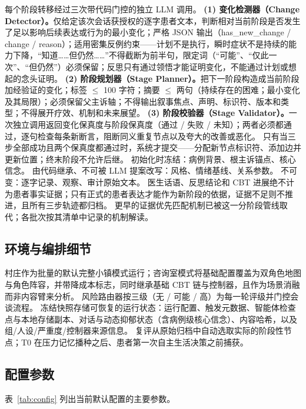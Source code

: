 \documentclass[11pt,a4paper]{article}
\begin{document}
每个阶段转移经过三次带代码门控的独立 LLM 调用。
\textbf{(1) 变化检测器（Change Detector）。}仅给定该次会话获授权的逐字患者文本，判断相对当前阶段是否发生了足以影响后续表达或行为的最小变化；严格 JSON 输出（has\_new\_change / change / reason）；适用密集反例约束——计划不是执行，瞬时症状不是持续的能力下降，“知道……但仍然……”不得截断为前半句，限定词（“可能”、“仅此一次”、“但仍然”）必须保留；反思只有通过领悟才能证明变化，不能通过计划或想起的念头证明。
\textbf{(2) 阶段规划器（Stage Planner）。}把下一阶段构造成当前阶段加经验证的变化；标签 $\le$ 100 字符；摘要 $\le$ 两句（持续存在的困难；最小变化及其局限）；必须保留父主诉轴；不得输出叙事焦点、声明、标识符、版本和类型；不得展开疗效、机制和未来展望。
\textbf{(3) 阶段校验器（Stage Validator）。}一次独立调用返回变化保真度与阶段保真度（通过 / 失败 / 未知）；两者必须都通过，逐句检查每条新断言，阻断同义重复节点以及夸大的改善或恶化。
只有当三步全部成功且两个保真度都通过时，系统才提交——分配新节点标识符、添加边并更新位置；终末阶段不允许后继。
初始化时冻结：病例背景、根主诉锚点、核心信念。
由代码继承、不可被 LLM 提案改写：风格、情绪基线、关系参数。
不可变：逐字记录、观察、审计原始文本。
医生话语、反思结论和 CBT 进展绝不计为患者事实证据；只有正式的患者表达才能作为新阶段的依据，证据不足则不推进，且所有三步轨迹都归档。
更早的证据优先匹配机制已被这一分阶段管线取代；各批次按其清单中记录的机制解读。

\subsection{环境与编排细节}

村庄作为批量的默认完整小镇模式运行；咨询室模式将基础配置覆盖为双角色地图与角色阵容，并带降成本标志，同时继承基础 CBT 链与控制器，且作为场景消融而非内容臂来分析。
风险路由器按三级（无 / 可能 / 高）为每一轮评级并门控会谈流程。
冻结快照存储可恢复的运行状态：运行配置、触发元数据、智能体检查点与本地存储副本、对话与动态抑郁状态（含病例级核心信念）、内容哈希，以及组/人设/严重度/控制器来源信息。
复评从原始归档中自动选取实际的阶段性节点；T0 在压力记忆播种之后、患者第一次自主生活决策之前捕获。

\subsection{配置参数}

表~\ref{tab:config} 列出当前默认配置的主要参数。
\end{document}

